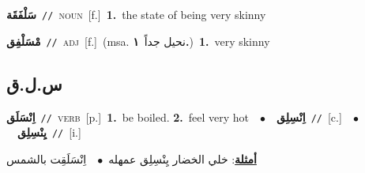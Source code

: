 \documentclass[10pt,a4paper,twoside]{article} %
\begin{document}
\begin{multicols}{2}
{\setlength\topsep{0pt}\textbf{\foreignlanguage{arabic}{سَلْفَقَة}}\ {\color{gray}\texttt{//}\color{black}}\ \textsc{noun}\ [f.]\ \textbf{1.}~the state of being very skinny\ } \vspace{2mm}

{\setlength\topsep{0pt}\textbf{\foreignlanguage{arabic}{مْسَلْفِق}}\ {\color{gray}\texttt{//}\color{black}}\ \textsc{adj}\ [f.]\ \color{gray}(msa. \foreignlanguage{arabic}{نحيل جداً}~\foreignlanguage{arabic}{\textbf{١.}})\color{black}\ \textbf{1.}~very skinny\ } \vspace{2mm}

\vspace{-3mm}
\subsection*{\color{blue}\foreignlanguage{arabic}{س.ل.ق}\color{blue}{}} 

{\setlength\topsep{0pt}\textbf{\foreignlanguage{arabic}{اِنْسَلَق}}\ {\color{gray}\texttt{//}\color{black}}\ \textsc{verb}\ [p.]\ \textbf{1.}~be boiled.  \textbf{2.}~feel very hot\ \ $\bullet$\ \ \setlength\topsep{0pt}\textbf{\foreignlanguage{arabic}{اِنْسِلِق}}\ {\color{gray}\texttt{//}\color{black}}\ [c.]\ \ $\bullet$\ \ \setlength\topsep{0pt}\textbf{\foreignlanguage{arabic}{يِنْسِلِق}}\ {\color{gray}\texttt{//}\color{black}}\ [i.]\  \begin{flushright}\color{gray}\foreignlanguage{arabic}{\textbf{\underline{\foreignlanguage{arabic}{أمثلة}}}: خلي الخضار يِنْسِلِق عمهله\ $\bullet$\ \  اِنْسَلَقِت بالشمس}\end{flushright}\color{black}} \vspace{2mm}


\end{multicols}
\end{document}
